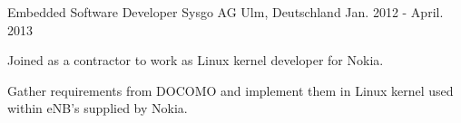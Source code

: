   \cventry
    {Embedded Software Developer} %
    {Sysgo AG} %
    {Ulm, Deutschland} %
    {Jan. 2012 - April. 2013} %
    {
      \begin{cvitems} %
        \item {Joined as a contractor to work as Linux kernel developer for Nokia.}
        \item {Gather requirements from DOCOMO and implement them in Linux kernel used within eNB's supplied by Nokia.}
       \end{cvitems}
    }
